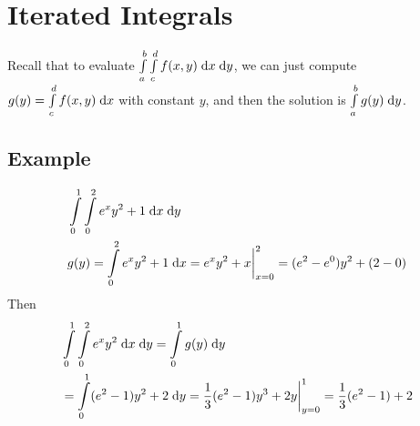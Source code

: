 \documentclass[letterpaper,11pt]{article}
\begin{document}
\section*{Iterated Integrals}
  Recall that to evaluate $\int \limits_{a}^{b} \int \limits_{c}^{d} f(x, y) \;\mathrm{d}x \;\mathrm{d}y$,
  we can just compute $g(y) = \int \limits_{c}^{d} f(x, y) \;\mathrm{d}x$ with constant $y$,
  and then the solution is $\int \limits_{a}^{b} g(y) \;\mathrm{d}y$.

  \subsection*{Example}
  \begin{align*}
    & \int \limits_{0}^{1} \int \limits_{0}^{2} e^{x} y^2 + 1 \;\mathrm{d}x \;\mathrm{d}y\\
    & g(y) = \int \limits_{0}^{2} e^{x} y^2 + 1 \;\mathrm{d}x = e^x y^2 + x \bigg \rvert_{x = 0}^{2} = (e^{2} - e^{0}) y^2 + (2 - 0)
  \end{align*}
  Then
  \begin{align*}
    & \int \limits_{0}^{1} \int \limits_{0}^{2} e^{x} y^2 \;\mathrm{d}x \;\mathrm{d}y = \int \limits_{0}^{1} g(y) \;\mathrm{d}y\\
    & = \int \limits_{0}^{1} (e^{2} - 1) y^2 + 2 \;\mathrm{d}y
      = \frac{1}{3} (e^{2} - 1) y^3 + 2 y \bigg \rvert_{y = 0}^{1}
      = \frac{1}{3} (e^{2} - 1) + 2
  \end{align*}
\end{document}
